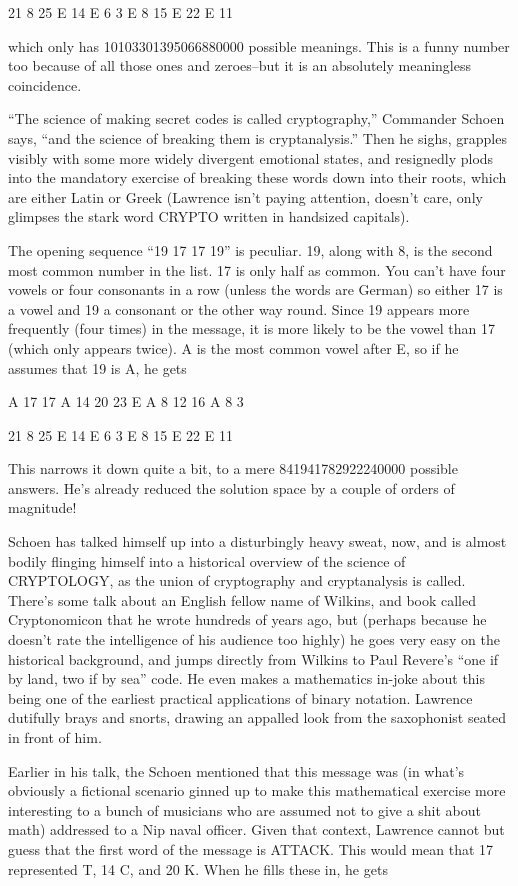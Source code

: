 \documentclass{42-en}
\begin{document}
21 8 25 E 14	E 6 3 E 8	15 E 22 E 11

which only has 10103301395066880000 possible meanings. This is a funny number too because of all those ones and zeroes--but it is an absolutely meaningless coincidence.

``The science of making secret codes is called cryptography,'' Commander Schoen says, ``and the science of breaking them is cryptanalysis.'' Then he sighs, grapples visibly with some more widely divergent emotional states, and resignedly plods into the mandatory exercise of breaking these words down into their roots, which are either Latin or Greek (Lawrence isn't paying attention, doesn't care, only glimpses the stark word CRYPTO written in handsized capitals).

The opening sequence ``19 17 17 19'' is peculiar. 19, along with 8, is the second most common number in the list. 17 is only half as common. You can't have four vowels or four consonants in a row (unless the words are German) so either 17 is a vowel and 19 a consonant or the other way round. Since 19 appears more frequently (four times) in the message, it is more likely to be the vowel than 17 (which only appears twice). A is the most common vowel after E, so if he assumes that 19 is A, he gets

A 17 17 A 14	20 23 E A 8 12 16 A 8 3

21 8 25 E 14	E 6 3 E 8 15 E 22 E 11

This narrows it down quite a bit, to a mere 841941782922240000 possible answers. He's already reduced the solution space by a couple of orders of magnitude!

Schoen has talked himself up into a disturbingly heavy sweat, now, and is almost bodily flinging himself into a historical overview of the science of CRYPTOLOGY, as the union of cryptography and cryptanalysis is called. There's some talk about an English fellow name of Wilkins, and book called Cryptonomicon that he wrote hundreds of years ago, but (perhaps because he doesn't rate the intelligence of his audience too highly) he goes very easy on the historical background, and jumps directly from Wilkins to Paul Revere's ``one if by land, two if by sea'' code. He even makes a mathematics in-joke about this being one of the earliest practical applications of binary notation. Lawrence dutifully brays and snorts, drawing an appalled look from the saxophonist seated in front of him.

Earlier in his talk, the Schoen mentioned that this message was (in what's obviously a fictional scenario ginned up to make this mathematical exercise more interesting to a bunch of musicians who are assumed not to give a shit about math) addressed to a Nip naval officer. Given that context, Lawrence cannot but guess that the first word of the message is ATTACK. This would mean that 17 represented T, 14 C, and 20 K. When he fills these in, he gets
\end{document}
